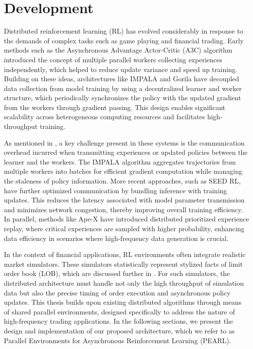 \chapter{Development}
\label{ch:development}
Distributed reinforcement learning (RL) has evolved considerably in response to the demands of complex tasks such as game playing and financial trading.
Early methods such as the Asynchronous Advantage Actor-Critic (A3C)
algorithm introduced the concept of multiple parallel workers collecting experiences independently,
which helped to reduce update variance and speed up training.
Building on these ideas, architectures like IMPALA and Gorila have decoupled data collection from model training by using
a decentralized learner and worker structure, which periodically synchronizes the policy with the updated gradient
from the workers through gradient passing.
This design enables significant scalability across heterogeneous computing resources and facilitates high-throughput training.

As mentioned in , a key challenge present in these systems is the communication overhead incurred when transmitting experiences or
updated policies between the learner and the workers.
The IMPALA algorithm aggregates trajectories from multiple workers into
batches for efficient gradient computation while managing the staleness of policy information.
More recent approaches, such as SEED RL, have further optimized communication by bundling inference with training updates.
This reduces the latency associated with model parameter transmission and minimizes network congestion, thereby improving overall training efficiency.
In parallel, methods like Ape-X have introduced distributed prioritized experience replay, where critical experiences are sampled with higher probability,
enhancing data efficiency in scenarios where high-frequency data generation is crucial.

In the context of financial applications, RL environments often integrate realistic market simulators.
These simulators statistically represent stylized facts of limit order book (LOB), which are discussed
further in .
For such simulators, the distributed architecture must handle not only the high throughput of simulation data but also the
precise timing of order execution and asynchronous policy updates.
This thesis builds upon existing distributed algorithms through means of shared parallel environments,
designed specifically to address the nature of high-frequency trading applications.
In the following sections, we present the design and implementation of our proposed architecture,
which we refer to as Parallel Environments for Asynchronous Reinforcement Learning (PEARL).

